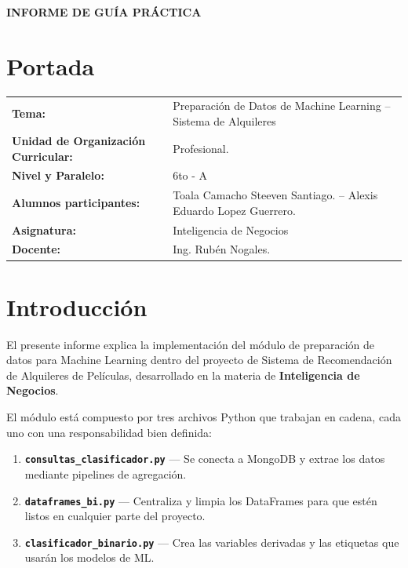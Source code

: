 \documentclass[12pt,a4paper]{article}
\begin{document}
\begin{center}
    {\large\textbf{INFORME DE GU\'IA PR\'ACTICA}}
\end{center}

\section{Portada}
\begin{flushleft}
\renewcommand{\arraystretch}{1.3}
\begin{tabular}{@{} l p{10cm} @{}}
    \textbf{Tema:} & Preparaci\'on de Datos de Machine Learning -- \newline Sistema de Alquileres \\
    \textbf{Unidad de Organizaci\'on Curricular:} & Profesional. \\
    \textbf{Nivel y Paralelo:} & 6to - A \\
    \textbf{Alumnos participantes:} & Toala Camacho Steeven Santiago. -- \newline Alexis Eduardo Lopez Guerrero. \\
    \textbf{Asignatura:} & Inteligencia de Negocios \\
    \textbf{Docente:} & Ing. Rub\'en Nogales. \\
\end{tabular}
\end{flushleft}

\section{Introducci\'on}

El presente informe explica la implementaci\'on del m\'odulo de preparaci\'on de
datos para Machine Learning dentro del proyecto de Sistema de Recomendaci\'on de
Alquileres de Pel\'iculas, desarrollado en la materia de \textbf{Inteligencia
de Negocios}.

El m\'odulo est\'a compuesto por tres archivos Python que trabajan en cadena,
cada uno con una responsabilidad bien definida:

\begin{enumerate}
  \item \textbf{\texttt{consultas\_clasificador.py}} --- Se conecta a MongoDB
        y extrae los datos mediante pipelines de agregaci\'on.
  \item \textbf{\texttt{dataframes\_bi.py}} --- Centraliza y limpia los
        DataFrames para que est\'en listos en cualquier parte del proyecto.
  \item \textbf{\texttt{clasificador\_binario.py}} --- Crea las variables
        derivadas y las etiquetas que usar\'an los modelos de ML.
\end{enumerate}
\end{document}

